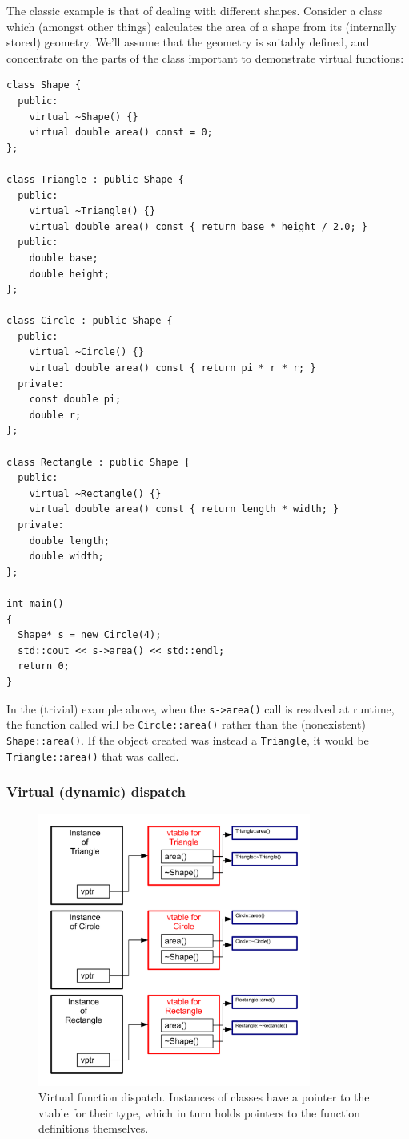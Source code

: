 \documentclass[a4paper]{scrartcl}
\begin{document}
The classic example is that of dealing with different shapes. Consider a class which (amongst other things) calculates the area of a shape from its (internally stored) geometry. We'll assume that the geometry is suitably defined, and concentrate on the parts of the class important to demonstrate virtual functions:

\begin{verbatim}
class Shape {
  public:
    virtual ~Shape() {}
    virtual double area() const = 0;
};

class Triangle : public Shape {
  public:
    virtual ~Triangle() {}
    virtual double area() const { return base * height / 2.0; }
  public:
    double base;
    double height;
};

class Circle : public Shape {
  public:
    virtual ~Circle() {}
    virtual double area() const { return pi * r * r; }
  private:
    const double pi;
    double r;
};

class Rectangle : public Shape {
  public:
    virtual ~Rectangle() {}
    virtual double area() const { return length * width; }
  private:
    double length;
    double width;
};

int main()
{
  Shape* s = new Circle(4);
  std::cout << s->area() << std::endl;
  return 0;
}
\end{verbatim}

In the (trivial) example above, when the \verb|s->area()| call is resolved at runtime, the function called will be \verb|Circle::area()| rather than the (nonexistent) \verb|Shape::area()|. If the object created was instead a \verb|Triangle|, it would be \verb|Triangle::area()| that was called.

\subsubsection{Virtual (dynamic) dispatch}\label{sec:vdispatch}
\begin{figure}[t]
\center
\includegraphics[width=0.8\textwidth]{vdispatch}
\caption[Virtual function dispatch]{\label{virtual_dispatch}Virtual function dispatch. Instances of classes have a pointer to the vtable for their type, which in turn holds pointers to the function definitions themselves.}
\end{figure}
\end{document}

